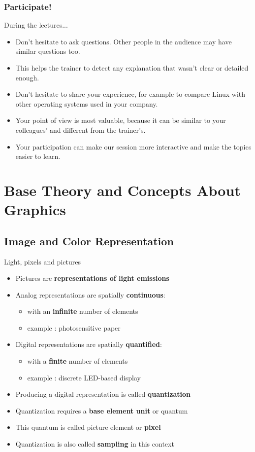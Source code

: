 \begin{frame}
\frametitle{Participate!}
During the lectures...
\begin{itemize}
\item Don't hesitate to ask questions. Other people in the audience may have
similar questions too.
\item This helps the trainer to detect any explanation that wasn't clear or
detailed enough.
\item Don't hesitate to share your experience, for example to compare Linux
with other operating systems used in your company.
\item Your point of view is most valuable, because it can be similar to your
colleagues' and different from the trainer's.
\item Your participation can make our session more interactive and make the
topics easier to learn.
\end{itemize}
\end{frame}

\section{Base Theory and Concepts About Graphics}

\subsection{Image and Color Representation}

\begin{frame}{Light, pixels and pictures}
  \begin{itemize}
  \item Pictures are {\bf representations of light emissions}
  \item Analog representations are spatially {\bf continuous}:
    \begin{itemize}
    \item with an {\bf infinite} number of elements
    \item example : photosensitive paper
    \end{itemize}
  \item Digital representations are spatially {\bf quantified}:
    \begin{itemize}
    \item with a {\bf finite} number of elements
    \item example : discrete LED-based display
    \end{itemize}
  \item Producing a digital representation is called \textbf{quantization}
  \item Quantization requires a {\bf base element unit} or quantum
  \item This quantum is called picture element or {\bf pixel}
  \item Quantization is also called \textbf{sampling} in this context
  \end{itemize}
\end{frame}

